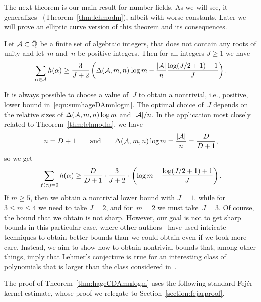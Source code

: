 \documentclass[12pt,reqno]{amsart}
\begin{document}
The next theorem is our main result for number fields.  As
we will see, it generalizes~\cite{BoDoMo,BoHaMo,DuMo,GaIsMoPiWi}
(Theorem~\ref{thm:lehmodm}), albeit with worse constants.  Later we
will prove an elliptic curve version of this theorem and its
consequences.

\begin{theorem}
\label{thm:hageCDAmnlogm}
Let ${\mathcal A}\subset\bar{\mathbb{Q}}$ be a finite set of algebraic integers, that
does not contain any roots of unity and let~$m$ and~$n$ be positive
integers. Then for all integers $J\ge1$ we have
\begin{equation}
  \label{eqn:sumhageDAmnlogm}
  \sum_{\alpha\in{\mathcal A}}h(\alpha) \ge \frac{3}{J+2}\left(
  \Delta({\mathcal A},m,n) \log m
    - \frac{|{\mathcal A}|}{n}\frac{\log(J/2+1)+1}{J}\right).
\end{equation}
\end{theorem}

\begin{remark}
It is always possible to choose a value of~$J$ to obtain a nontrivial,
i.e., positive, lower bound in~\eqref{eqn:sumhageDAmnlogm}. The
optimal choice of~$J$ depends on the relative sizes of
$\Delta({\mathcal A},m,n)\log m$ and $|{\mathcal A}|/n$. In the application most closely related
to Theorem~\ref{thm:lehmodm}, we have
\[
  n=D+1\qquad\text{and}\qquad
  \Delta({\mathcal A},m,n)\log m = \frac{|{\mathcal A}|}{n} = \frac{D}{D+1},
\]
so we get
\[
  \sum_{f(\alpha)=0} h(\alpha) \ge \frac{D}{D+1}\cdot\frac{3}{J+2}
    \cdot\left(\log m - \frac{\log(J/2+1)+1}{J}\right).
\]
If $m\ge5$, then we obtain a nontrivial lower bound with $J=1$, while
for~$3\le m\le 4$ we need to take $J=2$, and for~$m=2$ we must
take~$J=3$.  Of course, the bound that we obtain is not sharp. 
However, our goal is not to get sharp bounds in this particular case,
where other authors~\cite{BoDoMo,BoHaMo,DuMo,GaIsMoPiWi} have used
intricate techniques to obtain better bounds than we could obtain even
if we took more care. Instead, we aim to show how to obtain nontrivial
bounds that, among other things, imply that Lehmer's conjecture is
true for an interesting class of polynomials that is larger than the
class considered in~\cite{BoDoMo,BoHaMo,DuMo,GaIsMoPiWi}.
\end{remark}


The proof of Theorem~\ref{thm:hageCDAmnlogm}  uses the following
standard Fej\'er kernel estimate, whose proof we relegate to 
Section~\ref{section:fejarproof}.
\end{document}
